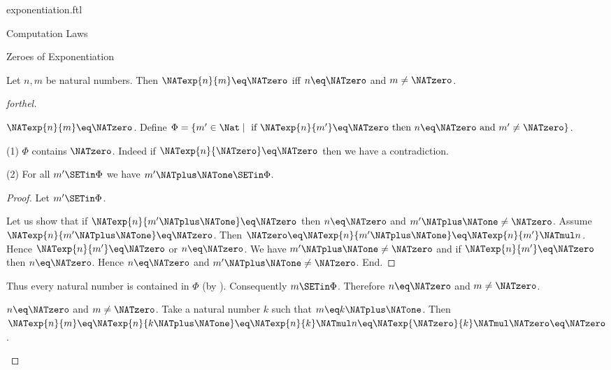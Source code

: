 \documentclass{naproche-library}
\begin{document}
\begin{smodule}[title=Exponentiation]{exponentiation.ftl}
\begin{sfragment}{Computation Laws}
  \begin{sfragment}{Zeroes of Exponentiation}
    \begin{proposition}[forthel,id=ARITHMETIC_09_3860221447372800]
      Let $n, m$ be natural numbers.
      Then $\NATexp{n}{m} \eq \NATzero$ iff $n \eq \NATzero$ and $m \neq \NATzero$.
    \end{proposition}
    \begin{proof}[forthel]
      \begin{case}{$\NATexp{n}{m} \eq \NATzero$.}
        Define $\Phi = \{ m' \in \Nat \mid\text{ if }\NATexp{n}{m'} \eq \NATzero\text{ then }n \eq \NATzero\text{ and }m' \neq \NATzero \}$.

        (1) $\Phi$ contains $\NATzero$.
        Indeed if $\NATexp{n}{\NATzero} \eq \NATzero$ then we have a contradiction.

        (2) For all $m' \SETin \Phi$ we have $m' \NATplus \NATone \SETin \Phi$.
        \begin{proof}
          Let $m' \SETin \Phi$.

          Let us show that if $\NATexp{n}{m' \NATplus \NATone} \eq \NATzero$ then $n \eq \NATzero$ and $m' \NATplus \NATone \neq \NATzero$.
            Assume $\NATexp{n}{m' \NATplus \NATone} \eq \NATzero$.
            Then $\NATzero \eq \NATexp{n}{m' \NATplus \NATone} \eq \NATexp{n}{m'} \NATmul n$.
            Hence $\NATexp{n}{m'} \eq \NATzero$ or $n \eq \NATzero$.
            We have $m' \NATplus \NATone \neq \NATzero$ and if $\NATexp{n}{m'} \eq \NATzero$ then $n \eq \NATzero$.
            Hence $n \eq \NATzero$ and $m' \NATplus \NATone \neq \NATzero$.
          End.
        \end{proof}

        Thus every natural number is contained in $\Phi$ (by ).
        Consequently $m \SETin \Phi$.
        Therefore $n \eq \NATzero$ and $m \neq \NATzero$.
      \end{case}

      \begin{case}{$n \eq \NATzero$ and $m \neq \NATzero$.}
        Take a natural number $k$ such that $m \eq k \NATplus \NATone$.
        Then $\NATexp{n}{m}
          \eq \NATexp{n}{k \NATplus \NATone}
          \eq \NATexp{n}{k} \NATmul n
          \eq \NATexp{\NATzero}{k} \NATmul \NATzero
          \eq \NATzero$.
      \end{case}
    \end{proof}
  \end{sfragment}
\end{sfragment}
\end{smodule}
\end{document}
